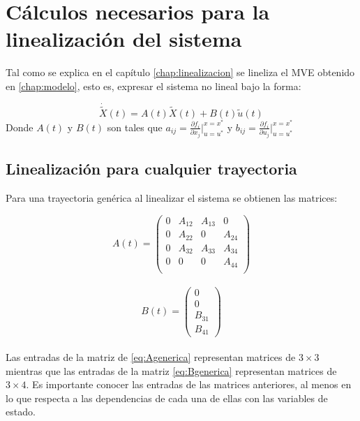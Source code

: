 %


\chapter{C\'alculos necesarios para la linealizaci\'on del sistema}
\label{chap:anexo_linealizacion}

Tal como se explica en el cap\'itulo \ref{chap:linealizacion} se lineliza el MVE obtenido en \ref{chap:modelo}, esto es, expresar el sistema no lineal bajo la forma:

\begin{equation}
\dot{\tilde{X}}(t)=A(t)\tilde{X}(t)+B(t)\tilde{u}(t)
\end{equation}
Donde $A(t)$ y $B(t)$ son tales que $a_{ij}= \frac{\partial f_i}{\partial x_j}\vert_{u=u^*}^{x=x^*}$ y  $b_{ij}= \frac{\partial f_i}{\partial u_j}\vert_{u=u^*}^{x=x^*}$

\section{Linealizaci\'on para cualquier trayectoria}

Para una trayectoria gen\'erica al linealizar el sistema se obtienen las matrices:

\begin{equation}
\label{eq:Agenerica}
A(t)=\left(\begin{array}{cccc}
0 & A_{12} & A_{13} & 0 \\
0 & A_{22} & 0      & A_{24}\\
0 & A_{32} & A_{33} & A_{34}\\
0 & 0      & 0      & A_{44} \\    
\end{array}\right)
\end{equation}\\


\begin{equation}
\label{eq:Bgenerica}
B(t)=\left(\begin{array}{c}
0\\
0\\
B_{31}\\
B_{41} 
\end{array}\right)
\end{equation}\\
Las entradas de la matriz de \ref{eq:Agenerica} representan matrices de $3\times3$ mientras que las entradas de la matriz \ref{eq:Bgenerica} representan matrices de $3\times4$. Es importante conocer las entradas de las matrices anteriores, al menos en lo que respecta a las dependencias de cada una de ellas con las variables de estado. 


